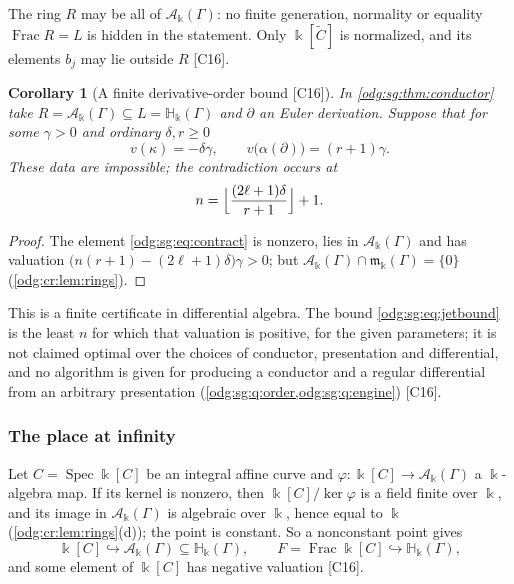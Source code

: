 \documentclass[11pt,oneside]{article}
\numberwithin{equation}{section}
\newtheorem{corollary}[corollary]{Corollary}
\theoremstyle{definition}
\theoremstyle{remark}
\newcommand{\Frac}{\operatorname{Frac}}
\newcommand{\src}[1]{\textup{\textsf{\small[#1]}}}
\newcommand{\crH}{\mathbb H_\Bbbk(\Gamma)}
\newcommand{\crA}{\mathcal A_\Bbbk(\Gamma)}
\newcommand{\crm}{\mathfrak m_\Bbbk(\Gamma)}
\newcommand{\Spec}{\operatorname{Spec}}
\begin{document}
The ring $R$ may be all of $\crA$: no finite generation, normality or equality
$\Frac R=L$ is hidden in the statement. Only $\Bbbk[\widetilde C]$ is normalized, and its
elements $b_j$ may lie outside $R$ \src{C16}.

\begin{corollary}[A finite derivative-order bound \src{C16}]\label{odg:sg:cor:jetbound}
In \cref{odg:sg:thm:conductor} take $R=\crA\subseteq L=\crH$ and $\partial$ an Euler
derivation. Suppose that for some $\gamma>0$ and ordinary $\delta,r\ge0$
\[
 v(\kappa)=-\delta\gamma,\qquad v\bigl(\alpha(\partial)\bigr)=(r+1)\gamma .
\]
These data are impossible; the contradiction occurs at
\begin{equation}\label{odg:sg:eq:jetbound}
 n=\Bigl\lfloor\frac{(2\ell+1)\delta}{r+1}\Bigr\rfloor+1 .
\end{equation}
\end{corollary}
\begin{proof}
The element \eqref{odg:sg:eq:contract} is nonzero, lies in $\crA$ and has valuation
$\bigl(n(r+1)-(2\ell+1)\delta\bigr)\gamma>0$; but $\crA\cap\crm=\{0\}$
(\cref{odg:cr:lem:rings}).
\end{proof}

This is a finite certificate in differential algebra. The bound \eqref{odg:sg:eq:jetbound}
is the least $n$ for which that valuation is positive, for the given parameters; it is not
claimed optimal over the choices of conductor, presentation and differential, and no
algorithm is given for producing a conductor and a regular differential from an
arbitrary presentation (\cref{odg:sg:q:order,odg:sg:q:engine}) \src{C16}.

\subsubsection{The place at infinity}\label{odg:sg:sub:place}

Let $C=\Spec\Bbbk[C]$ be an integral affine curve and $\varphi:\Bbbk[C]\to\crA$ a
$\Bbbk$-algebra map. If its kernel is nonzero, then $\Bbbk[C]/\ker\varphi$ is a field
finite over $\Bbbk$, and its image in $\crA$ is algebraic over $\Bbbk$, hence equal to
$\Bbbk$ (\cref{odg:cr:lem:rings}(d)); the point is constant. So a nonconstant point gives
\begin{equation}\label{odg:sg:eq:generic}
 \Bbbk[C]\hookrightarrow\crA\subseteq\crH,\qquad F=\Frac\Bbbk[C]\hookrightarrow\crH,
\end{equation}
and some element of $\Bbbk[C]$ has negative valuation \src{C16}.
\end{document}
